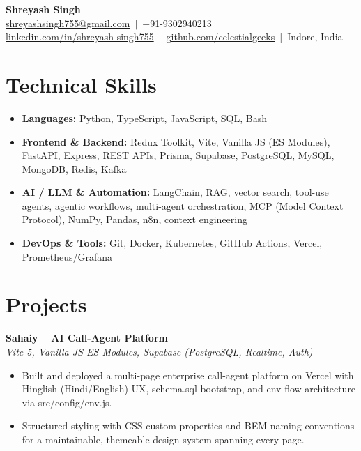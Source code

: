 \documentclass[letterpaper,11pt]{article}
\begin{document}
\begin{center}
  {\LARGE \bfseries Shreyash Singh}\\[3pt]
  \href{mailto:shreyashsingh755@gmail.com}{shreyashsingh755@gmail.com} \,$|$\, +91-9302940213 \\
  \href{https://linkedin.com/in/shreyash-singh755}{linkedin.com/in/shreyash-singh755} \,$|$\,
  \href{https://github.com/celestialgeeks}{github.com/celestialgeeks} \,$|$\, Indore, India
\end{center}

\section{Technical Skills}
\begin{itemize}
  \item \textbf{Languages:} Python, TypeScript, JavaScript, SQL, Bash
  \item \textbf{Frontend \& Backend:} Redux Toolkit, Vite, Vanilla JS (ES Modules), FastAPI, Express,
        REST APIs, Prisma, Supabase, PostgreSQL, MySQL, MongoDB, Redis, Kafka
  \item \textbf{AI / LLM \& Automation:} LangChain, RAG, vector search, tool-use agents,
        agentic workflows, multi-agent orchestration, MCP (Model Context Protocol), NumPy, Pandas,
        n8n, context engineering
  \item \textbf{DevOps \& Tools:} Git, Docker, Kubernetes, GitHub Actions, Vercel, Prometheus/Grafana
\end{itemize}

\section{Projects}
\textbf{Sahaiy -- AI Call-Agent Platform} \\
\hspace*{0.15in}\textit{Vite 5, Vanilla JS ES Modules, Supabase (PostgreSQL, Realtime, Auth)}
\begin{itemize}[leftmargin=0.32in,labelsep=0.45em,itemsep=2pt,topsep=2pt,partopsep=0pt,parsep=0pt]
  \item Built and deployed a multi-page enterprise call-agent platform on Vercel with Hinglish
        (Hindi/English) UX, schema.sql bootstrap, and env-flow architecture via src/config/env.js.
  \item Structured styling with CSS custom properties and BEM naming conventions for a maintainable,
        themeable design system spanning every page.
\end{itemize}
\end{document}
